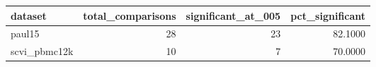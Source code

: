 \begin{tabular}{lrrr}
\toprule
dataset & total\_comparisons & significant\_at\_005 & pct\_significant \\
\midrule
paul15 & 28 & 23 & 82.1000 \\
scvi\_pbmc12k & 10 & 7 & 70.0000 \\
\bottomrule
\end{tabular}
